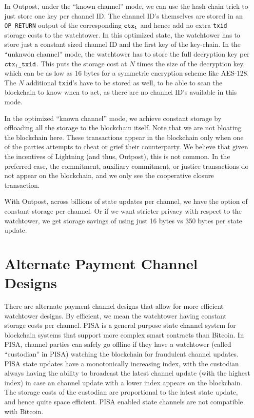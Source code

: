 In Outpost, under the ``known channel'' mode, we can use the hash chain trick to just store one key per channel ID. The channel ID's themselves are stored in an \texttt{OP\_RETURN} output of the corresponding $\texttt{ctx\textsubscript{1}}$ and hence add no extra \texttt{txid} storage costs to the watchtower. In this optimized state, the watchtower has to store just a constant sized channel ID and the first key of the key-chain. In the ``unknwon channel'' mode, the watchtower has to store the full decryption key per $\texttt{ctx\textsubscript{1}\_txid}$. This puts the storage cost at $N$ times the size of the decryption key, which can be as low as 16 bytes for a symmetric encryption scheme like AES-128. The $N$ additional \texttt{txid}'s have to be stored as well, to be able to scan the blockchain to know when to act, as there are no channel ID's available in this mode.

In the optimized ``known channel'' mode, we achieve constant storage by offloading all the storage to the blockchain itself. Note that we are not bloating the blockchain here. These transactions appear in the blockchain only when one of the parties attempts to cheat or grief their counterparty. We believe that given the incentives of Lightning (and thus, Outpost), this is not common. In the preferred case, the commitment, auxiliary commitment, or justice transactions do not appear on the blockchain, and we only see the cooperative closure transaction.

With Outpost, across billions of state updates per channel, we have the option of constant storage per channel. Or if we want stricter privacy with respect to the watchtower, we get storage savings of using just 16 bytes vs 350 bytes per state update.

\section {Alternate Payment Channel Designs}
There are alternate payment channel designs that allow for more efficient watchtower designs. By efficient, we mean the watchtower having constant storage costs per channel. PISA \cite{pisa} is a general purpose state channel system for blockchain systems that support more complex smart contracts than Bitcoin. In PISA, channel parties can safely go offline if they have a watchtower (called ``custodian'' in PISA) watching the blockchain for fraudulent channel updates. PISA state updates have a monotonically increasing index, with the custodian always having the ability to broadcast the latest channel update (with the highest index) in case an channel update with a lower index appears on the blockchain. The storage costs of the custodian are proportional to the latest state update, and hence quite space efficient. PISA enabled state channels are not compatible with Bitcoin.

